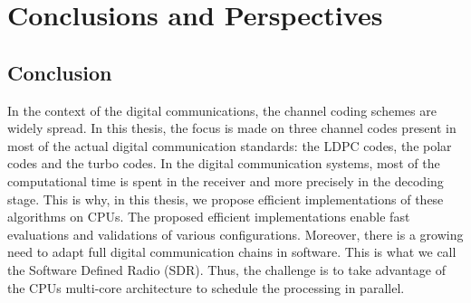 
\graphicspath{{main/conclusion/fig/}}

\chapter*{Conclusions and Perspectives}

\section*{Conclusion}


In the context of the digital communications, the channel coding schemes are
widely spread. In this thesis, the focus is made on three channel codes present
in most of the actual digital communication standards: the LDPC codes, the polar
codes and the turbo codes. In the digital communication systems, most of the
computational time is spent in the receiver and more precisely in the decoding
stage. This is why, in this thesis, we propose efficient implementations of
these algorithms on CPUs. The proposed efficient implementations enable fast
evaluations and validations of various configurations. Moreover, there is a
growing need to adapt full digital communication chains in software. This is
what we call the Software Defined Radio (SDR). Thus, the challenge is to take
advantage of the CPUs multi-core architecture to schedule the processing in
parallel.

